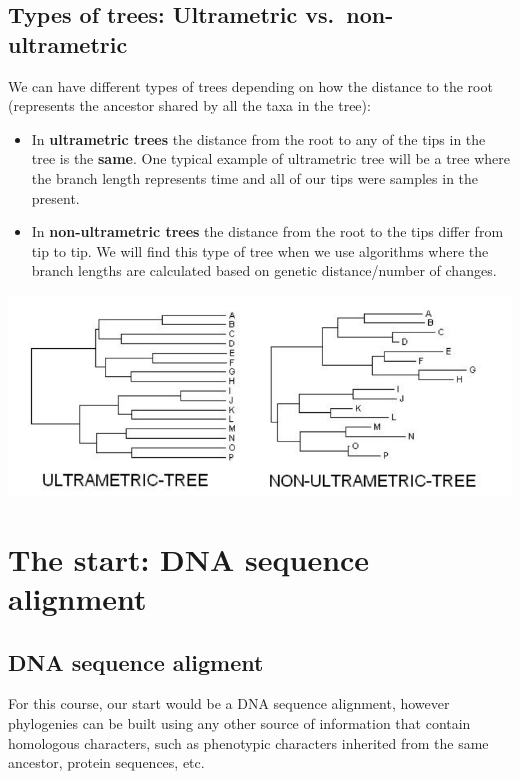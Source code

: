 \documentclass[
  letterpaper,
]{book}
\providecommand{\tightlist}{%
  \setlength{\itemsep}{0pt}\setlength{\parskip}{0pt}}\usepackage{longtable,booktabs,array}
\begin{document}
\hypertarget{types-of-trees-ultrametric-vs.-non-ultrametric}{%
\subsection{Types of trees: Ultrametric
vs.~non-ultrametric}\label{types-of-trees-ultrametric-vs.-non-ultrametric}}

We can have different types of trees depending on how the distance to
the root (represents the ancestor shared by all the taxa in the tree):

\begin{itemize}
\tightlist
\item
  In \textbf{ultrametric trees} the distance from the root to any of the
  tips in the tree is the \textbf{same}. One typical example of
  ultrametric tree will be a tree where the branch length represents
  time and all of our tips were samples in the present.
\item
  In \textbf{non-ultrametric trees} the distance from the root to the
  tips differ from tip to tip. We will find this type of tree when we
  use algorithms where the branch lengths are calculated based on
  genetic distance/number of changes.
\end{itemize}

\includegraphics{assets/images/chapters/phylogenomics/2.png}

\hypertarget{the-start-dna-sequence-alignment}{%
\section{The start: DNA sequence
alignment}\label{the-start-dna-sequence-alignment}}

\hypertarget{dna-sequence-aligment}{%
\subsection{DNA sequence aligment}\label{dna-sequence-aligment}}

For this course, our start would be a DNA sequence alignment, however
phylogenies can be built using any other source of information that
contain homologous characters, such as phenotypic characters inherited
from the same ancestor, protein sequences, etc.
\end{document}
